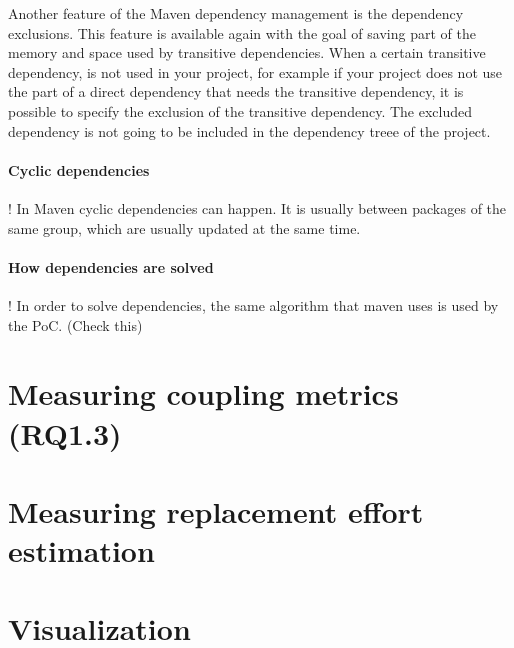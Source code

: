 Another feature of the Maven dependency management is the dependency exclusions. This feature is available again with the goal of saving part of the memory and space used by transitive dependencies. When a certain transitive dependency, is not used in your project, for example if your project does not use the part of a direct dependency that needs the transitive dependency, it is possible to specify the exclusion of the transitive dependency. The excluded dependency is not going to be included in the dependency treee of the project.

\paragraph{Cyclic dependencies}
! In Maven cyclic dependencies can happen. It is usually between packages of the same group, which are usually updated at the same time.

\paragraph{How dependencies are solved}
! In order to solve dependencies, the same algorithm that maven uses is used by the PoC. (Check this)

\section{Measuring coupling metrics (RQ1.3)}

\section{Measuring replacement effort estimation}

\section{Visualization}
